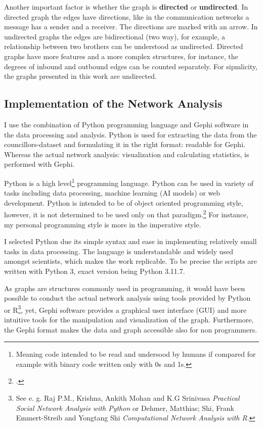 Another important factor is whether the graph is \textbf{directed} or \textbf{undirected}. In directed graph the edges have directions, like in the communication networks a message has a sender and a receiver. The directions are marked with an arrow. In undirected graphs the edges are bidirectional (two way), for example, a relationship between two brothers can be understood as undirected. Directed graphs have more features and a more complex structures, for instance, the degrees of inbound and outbound edges can be counted separately. For sipmlicity, the graphs presented in this work are undirected.

\subsection{Implementation of the Network Analysis}
I use the combination of Python programming language and Gephi software in the data processing and analysis. Python is used for extracting the data from the councillors-dataset and formulating it in the right format: readable for Gephi. Whereas the actual network analysis: visualization and calculating statistics, is performed with Gephi. 

Python is a high level\footnote{Meaning code intended to be read and undersood by humans if compared for example with binary code written only with 0s and 1s.} programming language. Python can be used in variety of tasks including data processing, machine learning (AI models) or web development. Python is intended to be of object oriented programming style, however, it is not determined to be used only on that paradigm.\footcite[p. 1.]{pythonbook} For instance, my personal programming style is more in the imperative style. 

I selected Python due its simple syntax and ease in implementing relatively small tasks in data processing. The language is understandable and widely used amongst scientists, which makes the work replicable. To be precise the scripts are written with Python 3, exact version being Python 3.11.7.

As graphs are structures commonly used in programming, it would have been possible to conduct the actual network analysis using tools provided by Python or R\footnote{See e. g. Raj P.M., Krishna, Ankith Mohan and K.G Srinivasa \textit{Practical Social Network Analysis with Python} or Dehmer, Matthias; Shi, Frank Emmert-Streib and Yongtang Shi \textit{Computational Network Analysis with R}.}, yet, Gephi software provides a graphical user interface (GUI) and more intuitive tools for the manipulation and visualization of the graph. Furthermore, the Gephi format makes the data and graph accessible also for non programmers.

